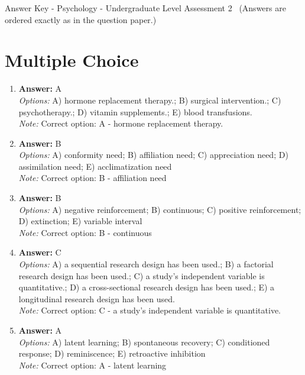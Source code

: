\documentclass[12pt]{article}
\begin{document}
\begin{center}
Answer Key - Psychology - Undergraduate Level Assessment 2 \
\small (Answers are ordered exactly as in the question paper.)
\end{center}

\section*{Multiple Choice}
\begin{enumerate}[label=\arabic*.]
\item \textbf{Answer:} A
\\ \textit{Options:} A) hormone replacement therapy.; B) surgical intervention.; C) psychotherapy.; D) vitamin supplements.; E) blood transfusions.
\\ \textit{Note:} Correct option: A - hormone replacement therapy.
\item \textbf{Answer:} B
\\ \textit{Options:} A) conformity need; B) affiliation need; C) appreciation need; D) assimilation need; E) acclimatization need
\\ \textit{Note:} Correct option: B - affiliation need
\item \textbf{Answer:} B
\\ \textit{Options:} A) negative reinforcement; B) continuous; C) positive reinforcement; D) extinction; E) variable interval
\\ \textit{Note:} Correct option: B - continuous
\item \textbf{Answer:} C
\\ \textit{Options:} A) a sequential research design has been used.; B) a factorial research design has been used.; C) a study's independent variable is quantitative.; D) a cross-sectional research design has been used.; E) a longitudinal research design has been used.
\\ \textit{Note:} Correct option: C - a study's independent variable is quantitative.
\item \textbf{Answer:} A
\\ \textit{Options:} A) latent learning; B) spontaneous recovery; C) conditioned response; D) reminiscence; E) retroactive inhibition
\\ \textit{Note:} Correct option: A - latent learning
\end{enumerate}
\end{document}
